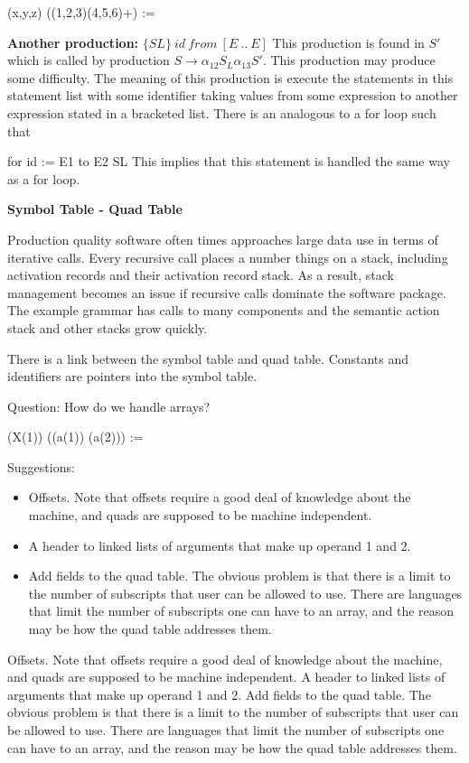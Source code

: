 \documentclass[11pt]{article}
\begin{document}
(x,y,z)  ((1,2,3)(4,5,6)+) := 


\textbf{\Large Another production:}
$\{SL\}\ id\ from\ [E\ ..\ E]$
This production is found in $S'$ which is called by production $S \to \alpha_{12} S_L \alpha_13 S'$.  This production may produce some difficulty.  The meaning of this production is execute the statements in this statement list with some identifier taking values from some expression to another expression stated in a bracketed list.  There is an analogous to a for loop such that 

for id := E1 to E2 
	SL
This implies that this statement is handled the same way as a for loop.  


\textbf{Symbol Table - Quad Table}

Production quality software often times approaches large data use in terms of iterative calls.  Every recursive call places a number things on a stack, including activation records and their activation record stack.   As a result, stack management becomes an issue if recursive calls dominate the software package.   The example grammar has calls to many components and the semantic action stack and other stacks grow quickly.  


There is a link between the symbol table and quad table.  Constants and identifiers are pointers into the symbol table.  


Question: How do we handle arrays?  

(X(1)) ((a(1)) (a(2))) := 

Suggestions:  
\begin{itemize}
\item Offsets.  Note that offsets require a good deal of knowledge about the machine, and quads are supposed to be machine independent.  
\item A header to linked lists of arguments that make up operand 1 and 2.  
\item Add fields to the quad table.  The obvious problem is that there is a limit to the number of subscripts that user can be allowed to use.  There are languages that limit the number of subscripts one can have to an array, and the reason may be how the quad table addresses them.  

\end{itemize}

Offsets.  Note that offsets require a good deal of knowledge about the machine, and quads are supposed to be machine independent.  
A header to linked lists of arguments that make up operand 1 and 2.  
Add fields to the quad table.  The obvious problem is that there is a limit to the number of subscripts that user can be allowed to use.  There are languages that limit the number of subscripts one can have to an array, and the reason may be how the quad table addresses them.  
\end{document}

